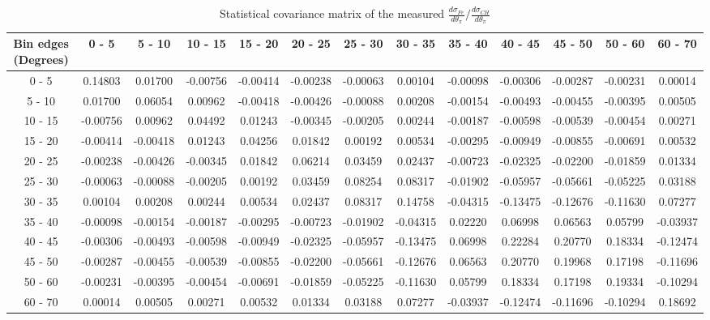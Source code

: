 \documentclass[aps,prl,twocolumn,superscriptaddress,nofootinbib]{revtex4-1}
\begin{document}
\begin{turnpage}
 \begin{table}[h!]
  \centering
  \caption{Statistical covariance matrix of the measured $\frac{d\sigma_{Fe}}{d\theta_{\pi}}/\frac{d\sigma_{CH}}{d\theta_{\pi}}$}
    \begin{tabular}{c||cccccccccccc}
      Bin edges (Degrees) & 0 - 5 & 5 - 10 & 10 - 15 & 15 - 20 & 20 - 25 & 25 - 30 & 30 - 35 & 35 - 40 & 40 - 45 & 45 - 50 & 50 - 60 & 60 - 70 \\
\hline \hline
        0 - 5 &  0.14803 &  0.01700 & -0.00756 & -0.00414 & -0.00238 & -0.00063 &  0.00104 & -0.00098 & -0.00306 & -0.00287 & -0.00231 &  0.00014 \\
       5 - 10 &  0.01700 &  0.06054 &  0.00962 & -0.00418 & -0.00426 & -0.00088 &  0.00208 & -0.00154 & -0.00493 & -0.00455 & -0.00395 &  0.00505 \\
      10 - 15 & -0.00756 &  0.00962 &  0.04492 &  0.01243 & -0.00345 & -0.00205 &  0.00244 & -0.00187 & -0.00598 & -0.00539 & -0.00454 &  0.00271 \\
      15 - 20 & -0.00414 & -0.00418 &  0.01243 &  0.04256 &  0.01842 &  0.00192 &  0.00534 & -0.00295 & -0.00949 & -0.00855 & -0.00691 &  0.00532 \\
      20 - 25 & -0.00238 & -0.00426 & -0.00345 &  0.01842 &  0.06214 &  0.03459 &  0.02437 & -0.00723 & -0.02325 & -0.02200 & -0.01859 &  0.01334 \\
      25 - 30 & -0.00063 & -0.00088 & -0.00205 &  0.00192 &  0.03459 &  0.08254 &  0.08317 & -0.01902 & -0.05957 & -0.05661 & -0.05225 &  0.03188 \\
      30 - 35 &  0.00104 &  0.00208 &  0.00244 &  0.00534 &  0.02437 &  0.08317 &  0.14758 & -0.04315 & -0.13475 & -0.12676 & -0.11630 &  0.07277 \\
      35 - 40 & -0.00098 & -0.00154 & -0.00187 & -0.00295 & -0.00723 & -0.01902 & -0.04315 &  0.02220 &  0.06998 &  0.06563 &  0.05799 & -0.03937 \\
      40 - 45 & -0.00306 & -0.00493 & -0.00598 & -0.00949 & -0.02325 & -0.05957 & -0.13475 &  0.06998 &  0.22284 &  0.20770 &  0.18334 & -0.12474 \\
      45 - 50 & -0.00287 & -0.00455 & -0.00539 & -0.00855 & -0.02200 & -0.05661 & -0.12676 &  0.06563 &  0.20770 &  0.19968 &  0.17198 & -0.11696 \\
      50 - 60 & -0.00231 & -0.00395 & -0.00454 & -0.00691 & -0.01859 & -0.05225 & -0.11630 &  0.05799 &  0.18334 &  0.17198 &  0.19334 & -0.10294 \\
      60 - 70 &  0.00014 &  0.00505 &  0.00271 &  0.00532 &  0.01334 &  0.03188 &  0.07277 & -0.03937 & -0.12474 & -0.11696 & -0.10294 &  0.18692 \\
    \end{tabular}
  \label{tablecov:Fe_Statistical_ThetaPi}
  \end{table}
\end{turnpage}
\end{document}
